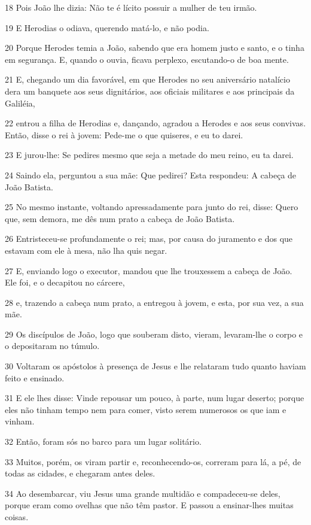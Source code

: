 \par 18 Pois João lhe dizia: Não te é lícito possuir a mulher de teu irmão.
\par 19 E Herodias o odiava, querendo matá-lo, e não podia.
\par 20 Porque Herodes temia a João, sabendo que era homem justo e santo, e o tinha em segurança. E, quando o ouvia, ficava perplexo, escutando-o de boa mente.
\par 21 E, chegando um dia favorável, em que Herodes no seu aniversário natalício dera um banquete aos seus dignitários, aos oficiais militares e aos principais da Galiléia,
\par 22 entrou a filha de Herodias e, dançando, agradou a Herodes e aos seus convivas. Então, disse o rei à jovem: Pede-me o que quiseres, e eu to darei.
\par 23 E jurou-lhe: Se pedires mesmo que seja a metade do meu reino, eu ta darei.
\par 24 Saindo ela, perguntou a sua mãe: Que pedirei? Esta respondeu: A cabeça de João Batista.
\par 25 No mesmo instante, voltando apressadamente para junto do rei, disse: Quero que, sem demora, me dês num prato a cabeça de João Batista.
\par 26 Entristeceu-se profundamente o rei; mas, por causa do juramento e dos que estavam com ele à mesa, não lha quis negar.
\par 27 E, enviando logo o executor, mandou que lhe trouxessem a cabeça de João. Ele foi, e o decapitou no cárcere,
\par 28 e, trazendo a cabeça num prato, a entregou à jovem, e esta, por sua vez, a sua mãe.
\par 29 Os discípulos de João, logo que souberam disto, vieram, levaram-lhe o corpo e o depositaram no túmulo.
\par 30 Voltaram os apóstolos à presença de Jesus e lhe relataram tudo quanto haviam feito e ensinado.
\par 31 E ele lhes disse: Vinde repousar um pouco, à parte, num lugar deserto; porque eles não tinham tempo nem para comer, visto serem numerosos os que iam e vinham.
\par 32 Então, foram sós no barco para um lugar solitário.
\par 33 Muitos, porém, os viram partir e, reconhecendo-os, correram para lá, a pé, de todas as cidades, e chegaram antes deles.
\par 34 Ao desembarcar, viu Jesus uma grande multidão e compadeceu-se deles, porque eram como ovelhas que não têm pastor. E passou a ensinar-lhes muitas coisas.
